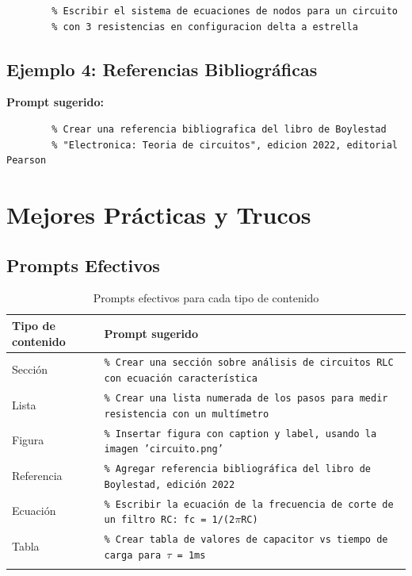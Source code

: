 \documentclass[11pt,a4paper]{article}
\newcommand{\codigo}[1]{\texttt{\textcolor{codigo}{#1}}}
\begin{document}
	\begin{lstlisting}
		% Escribir el sistema de ecuaciones de nodos para un circuito
		% con 3 resistencias en configuracion delta a estrella
	\end{lstlisting}
	
	\subsection{Ejemplo 4: Referencias Bibliográficas}
	
	\textbf{Prompt sugerido:}
	
	\begin{lstlisting}
		% Crear una referencia bibliografica del libro de Boylestad
		% "Electronica: Teoria de circuitos", edicion 2022, editorial Pearson
	\end{lstlisting}
	
	\newpage
	
	
	\section{Mejores Prácticas y Trucos}
	
	\subsection{Prompts Efectivos}
	
	\begin{longtable}{|p{}|p{}|}
		\hline
		\textbf{Tipo de contenido} & \textbf{Prompt sugerido} \\
		\hline
		Sección & \codigo{\% Crear una sección sobre análisis de circuitos RLC con ecuación característica} \\
		\hline
		Lista & \codigo{\% Crear una lista numerada de los pasos para medir resistencia con un multímetro} \\
		\hline
		Figura & \codigo{\% Insertar figura con caption y label, usando la imagen 'circuito.png'} \\
		\hline
		Referencia & \codigo{\% Agregar referencia bibliográfica del libro de Boylestad, edición 2022} \\
		\hline
		Ecuación & \codigo{\% Escribir la ecuación de la frecuencia de corte de un filtro RC: fc = 1/(2$\pi$RC)} \\
		\hline
		Tabla & \codigo{\% Crear tabla de valores de capacitor vs tiempo de carga para $\tau$ = 1ms} \\
		\hline
		\caption{Prompts efectivos para cada tipo de contenido}
		\label{tab:prompts}
	\end{longtable}
	
\end{document}
